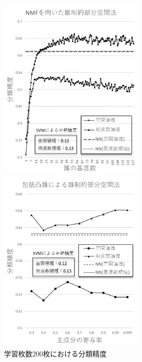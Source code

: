 \begin{figure}[htbp]
	\begin{minipage}{0.5\hsize}
		\begin{center}
			\includegraphics[width=70mm]{result/200-nmf.png}
		\end{center}
	\end{minipage}
	\begin{minipage}{0.5\hsize}
		\begin{center}
			\includegraphics[width=70mm]{result/200-comp.png}
		\end{center}
	\end{minipage}
	\caption{学習枚数200枚における分類精度}
\end{figure}

